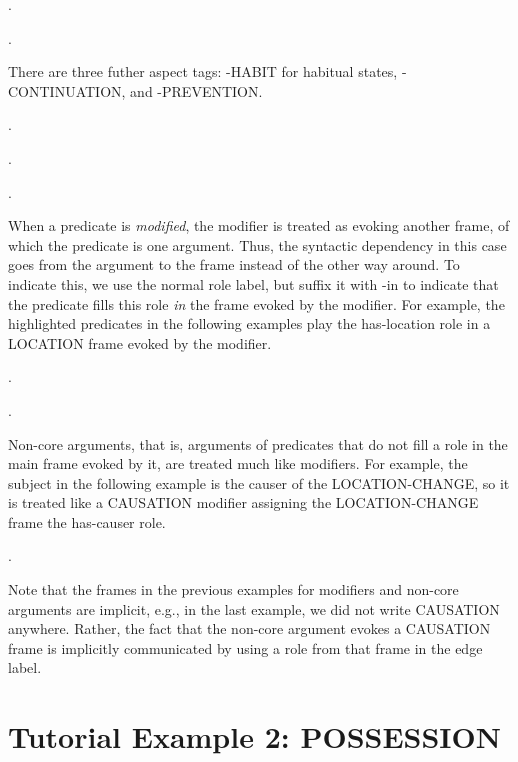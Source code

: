 \documentclass[a4paper]{article}
\newcommand{\fr}[1]{\textsf{#1}}
\newcommand{\rl}[1]{\textsf{#1}}
\begin{document}
\ex.

\ex.

There are three futher aspect tags: \fr{-HABIT} for habitual states, \fr{-CONTINUATION}, and \fr{-PREVENTION}.

\ex.

\ex.

\ex.

When a predicate is \emph{modified}, the modifier is treated as evoking another frame, of which the predicate is one argument. Thus, the syntactic dependency in this case goes from the argument to the frame instead of the other way around. To indicate this, we use the normal role label, but suffix it with \rl{-in} to indicate that the predicate fills this role \emph{in} the frame evoked by the modifier. For example, the highlighted predicates in the following examples play the \rl{has-location} role in a \fr{LOCATION} frame evoked by the modifier.

\ex.

\ex.

Non-core arguments, that is, arguments of predicates that do not fill a role in the main frame evoked by it, are treated much like modifiers. For example, the subject in the following example is the causer of the \fr{LOCATION-CHANGE}, so it is treated like a \fr{CAUSATION} modifier assigning the \textsf{LOCATION-CHANGE} frame the \rl{has-causer} role.

\ex.

Note that the frames in the previous examples for modifiers and non-core arguments are implicit, e.g., in the last example, we did not write \fr{CAUSATION} anywhere. Rather, the fact that the non-core argument evokes a \fr{CAUSATION} frame is implicitly communicated by using a role from that frame in the edge label.

\section{Tutorial Example 2: \fr{POSSESSION}}
\end{document}
